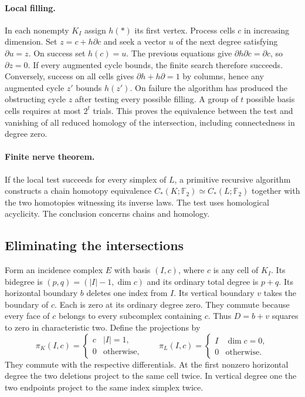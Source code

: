 \paragraph{Local filling.}
In each nonempty $K_I$ assign $h(*)$ its first vertex. Process cells $c$ in
increasing dimension. Set $z=c+h\partial c$ and seek a vector $u$ of the
next degree satisfying $\partial u=z$. On success set $h(c)=u$. The
previous equations give $\partial h\partial c=\partial c$,
so $\partial z=0$. If every augmented cycle bounds, the finite search
therefore succeeds. Conversely, success on all cells gives
$\partial h+h\partial=1$ by columns, hence any augmented cycle $z'$ bounds
$h(z')$. On failure the algorithm has produced the obstructing cycle $z$ after testing every possible filling. A group of $t$ possible basis cells
requires at most $2^t$ trials. This proves the equivalence between the test
and vanishing of all reduced homology of the intersection, including
connectedness in degree zero.

\paragraph{Finite nerve theorem.}
If the local test succeeds for every simplex of $L$, a primitive recursive
algorithm constructs a chain homotopy equivalence
$C_*(K;\mathbb F_2)\simeq C_*(L;\mathbb F_2)$ together with the two
homotopies witnessing its inverse laws. The test uses homological
acyclicity. The conclusion concerns chains and homology.

\subsection{Eliminating the intersections}

Form an incidence complex $E$ with basis $(I,c)$, where $c$ is any cell of
$K_I$. Its bidegree is $(p,q)=(|I|-1,\dim c)$ and its ordinary total
degree is $p+q$. Its horizontal boundary $b$ deletes one index from $I$. Its vertical boundary $v$ takes the boundary of $c$. Each is zero at its
ordinary degree zero. They commute because every face of $c$ belongs to
every subcomplex containing $c$. Thus $D=b+v$ squares to zero in
characteristic two. Define the projections by
\[
 \pi_K(I,c)=
 \begin{cases}c& |I|=1,\\0&\text{otherwise,}\end{cases}
 \qquad
 \pi_L(I,c)=
 \begin{cases}I& \dim c=0,\\0&\text{otherwise.}\end{cases}
\]
They commute with the respective differentials. At the first nonzero
horizontal degree the two deletions project to the same cell twice. In
vertical degree one the two endpoints project to the same index simplex twice.


